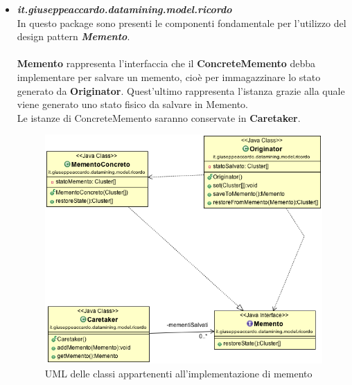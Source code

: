 \documentclass[a4paper, oneside]{book}
\begin{document}
\begin{itemize}
  \item \textit{\textbf{it.giuseppeaccardo.datamining.model.ricordo}}\\
  In questo package sono presenti le componenti fondamentale per l'utilizzo del design pattern \textit{\textbf{Memento}}. \\
  \\
  \textbf{Memento} rappresenta l'interfaccia che il  \textbf{ConcreteMemento} debba implementare per salvare un memento, cioè per immagazzinare lo stato generato da \textbf{Originator}. Quest'ultimo rappresenta l'istanza grazie alla quale viene generato uno stato fisico da salvare in Memento. \\Le istanze di ConcreteMemento saranno conservate in \textbf{Caretaker}.
  
  \begin{figure}[htp]
\centering
\includegraphics[width=13cm]{umlModelRicordo.png}
\caption{UML delle classi appartenenti all'implementazione di memento}
\label{fig:uml memento}
\end{figure}



\end{itemize}
\end{document}
